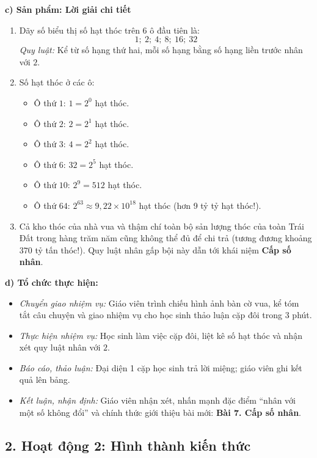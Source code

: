 \documentclass[12pt, a4paper]{article}
\begin{document}
\noindent \textbf{c) Sản phẩm: Lời giải chi tiết}
\begin{enumerate}[leftmargin=0.6cm]
    \item Dãy số biểu thị số hạt thóc trên 6 ô đầu tiên là:
    $$1; \ 2; \ 4; \ 8; \ 16; \ 32$$
    \textit{Quy luật:} Kể từ số hạng thứ hai, mỗi số hạng bằng số hạng liền trước nhân với $2$.
    \item Số hạt thóc ở các ô:
    \begin{itemize}
        \item Ô thứ $1$: $1 = 2^0$ hạt thóc.
        \item Ô thứ $2$: $2 = 2^1$ hạt thóc.
        \item Ô thứ $3$: $4 = 2^2$ hạt thóc.
        \item Ô thứ $6$: $32 = 2^5$ hạt thóc.
        \item Ô thứ $10$: $2^9 = 512$ hạt thóc.
        \item Ô thứ $64$: $2^{63} \approx 9{,}22 \times 10^{18}$ hạt thóc (hơn 9 tỷ tỷ hạt thóc!).
    \end{itemize}
    \item Cả kho thóc của nhà vua và thậm chí toàn bộ sản lượng thóc của toàn Trái Đất trong hàng trăm năm cũng không thể đủ để chi trả (tương đương khoảng $370$ tỷ tấn thóc!). Quy luật nhân gấp bội này dẫn tới khái niệm \textbf{Cấp số nhân}.
\end{enumerate}

\noindent \textbf{d) Tổ chức thực hiện:}
\begin{itemize}[leftmargin=0.8cm]
    \item \textit{Chuyển giao nhiệm vụ:} Giáo viên trình chiếu hình ảnh bàn cờ vua, kể tóm tắt câu chuyện và giao nhiệm vụ cho học sinh thảo luận cặp đôi trong 3 phút.
    \item \textit{Thực hiện nhiệm vụ:} Học sinh làm việc cặp đôi, liệt kê số hạt thóc và nhận xét quy luật nhân với $2$.
    \item \textit{Báo cáo, thảo luận:} Đại diện 1 cặp học sinh trả lời miệng; giáo viên ghi kết quả lên bảng.
    \item \textit{Kết luận, nhận định:} Giáo viên nhận xét, nhấn mạnh đặc điểm ``nhân với một số không đổi'' và chính thức giới thiệu bài mới: \textbf{Bài 7. Cấp số nhân}.
\end{itemize}

\subsection*{2. Hoạt động 2: Hình thành kiến thức}
\end{document}
